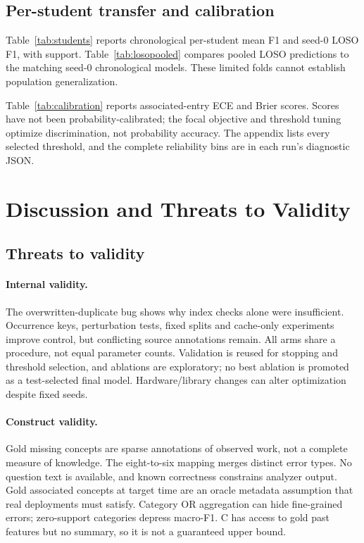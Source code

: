 \documentclass[11pt]{article}
\begin{document}
\subsection{Per-student transfer and calibration}
Table~\ref{tab:students} reports chronological per-student mean F1 and seed-0 LOSO F1, with support. Table~\ref{tab:losopooled} compares pooled LOSO predictions to the matching seed-0 chronological models. These limited folds cannot establish population generalization.



Table~\ref{tab:calibration} reports associated-entry ECE and Brier scores. Scores have not been probability-calibrated; the focal objective and threshold tuning optimize discrimination, not probability accuracy. The appendix lists every selected threshold, and the complete reliability bins are in each run's diagnostic JSON.


\section{Discussion and Threats to Validity}

\subsection{Threats to validity}
\paragraph{Internal validity.}
The overwritten-duplicate bug shows why index checks alone were insufficient. Occurrence keys, perturbation tests, fixed splits and cache-only experiments improve control, but conflicting source annotations remain. All arms share a procedure, not equal parameter counts. Validation is reused for stopping and threshold selection, and ablations are exploratory; no best ablation is promoted as a test-selected final model. Hardware/library changes can alter optimization despite fixed seeds.
\paragraph{Construct validity.}
Gold missing concepts are sparse annotations of observed work, not a complete measure of knowledge. The eight-to-six mapping merges distinct error types. No question text is available, and known correctness constrains analyzer output. Gold associated concepts at target time are an oracle metadata assumption that real deployments must satisfy. Category OR aggregation can hide fine-grained errors; zero-support categories depress macro-F1. C has access to gold past features but no summary, so it is not a guaranteed upper bound.
\end{document}
